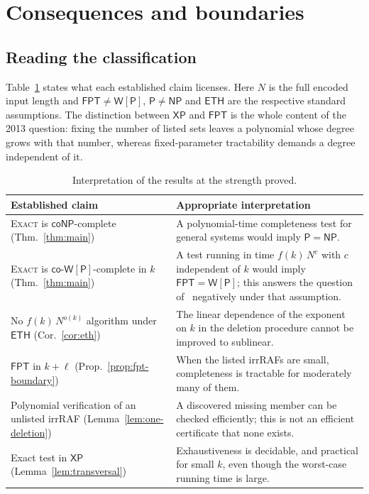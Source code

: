 \documentclass[11pt,a4paper]{article}
\theoremstyle{plain}
\theoremstyle{definition}
\theoremstyle{remark}
\newcommand{\Exact}{\textup{\textsc{Exact}}}
\newcommand{\NP}{\mathsf{NP}}
\newcommand{\coNP}{\mathsf{coNP}}
\newcommand{\Ptime}{\mathsf{P}}
\newcommand{\FPT}{\mathsf{FPT}}
\newcommand{\XP}{\mathsf{XP}}
\newcommand{\WP}{\mathsf{W[P]}}
\newcommand{\coWP}{\mathsf{co\text{-}W[P]}}
\newcommand{\ETH}{\mathsf{ETH}}
\newcommand{\Nlen}{N}
\begin{document}
\section{Consequences and boundaries}\label{sec:consequences}

\subsection{Reading the classification}

Table~\ref{tab:reading} states what each established claim licenses. Here $\Nlen$ is the full encoded input length and $\FPT\neq\WP$, $\Ptime\neq\NP$ and $\ETH$ are the respective standard assumptions. The distinction between $\XP$ and $\FPT$ is the whole content of the 2013 question: fixing the number of listed sets leaves a polynomial whose degree grows with that number, whereas fixed-parameter tractability demands a degree independent of it.

\begin{table}[t]
\centering
\small
\begin{tabular}{@{}>{\raggedright\arraybackslash}p{}>{\raggedright\arraybackslash}p{}@{}}
\toprule
\textbf{Established claim} & \textbf{Appropriate interpretation}\\
\midrule
\Exact{} is $\coNP$-complete (Thm.~\ref{thm:main}) & A polynomial-time completeness test for general systems would imply $\Ptime=\NP$.\\
\Exact{} is $\coWP$-complete in $k$ (Thm.~\ref{thm:main}) & A test running in time $f(k)\,\Nlen^{c}$ with $c$ independent of $k$ would imply $\FPT=\WP$; this answers the question of~\cite{steel2013minimal} negatively under that assumption.\\
No $f(k)\,\Nlen^{o(k)}$ algorithm under $\ETH$ (Cor.~\ref{cor:eth}) & The linear dependence of the exponent on $k$ in the deletion procedure cannot be improved to sublinear.\\
$\FPT$ in $k+\ell$ (Prop.~\ref{prop:fpt-boundary}) & When the listed irrRAFs are small, completeness is tractable for moderately many of them.\\
Polynomial verification of an unlisted irrRAF (Lemma~\ref{lem:one-deletion}) & A discovered missing member can be checked efficiently; this is not an efficient certificate that none exists.\\
Exact test in $\XP$ (Lemma~\ref{lem:transversal}) & Exhaustiveness is decidable, and practical for small $k$, even though the worst-case running time is large.\\
\bottomrule
\end{tabular}
\caption{Interpretation of the results at the strength proved.}
\label{tab:reading}
\end{table}
\end{document}

